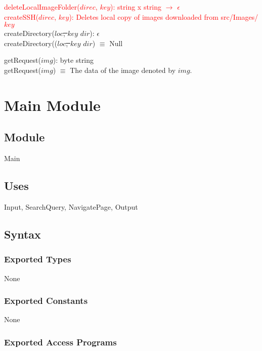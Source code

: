 \documentclass{article}
\begin{document}
\noindent \textcolor{red}{deleteLocalImageFolder($direc$, $key$): 
string x string  $\rightarrow$ $\epsilon$} \\
\textcolor{red}{createSSH($direc$, $key$): 
Deletes local copy of images downloaded from src/Images/$key$} \\

\noindent createDirectory(\st{$loc$, $key$} \color{red}$dir$\color{black}): $\epsilon$ \\
createDirectory((\st{$loc$, $key$} \color{red}$dir$\color{black}) $\equiv$ Null

\medskip

\color{red}
\noindent getRequest($img$): byte string \\
getRequest($img$) $\equiv$ The data of the image denoted by $img$.
\color{black}

\newpage

\section*{Main Module}

\subsection* {Module}

Main

\subsection* {Uses}

Input, SearchQuery, NavigatePage, Output

\subsection* {Syntax}

\subsubsection* {Exported Types}

None

\subsubsection* {Exported Constants}

None

\subsubsection* {Exported Access Programs}
\end{document}
